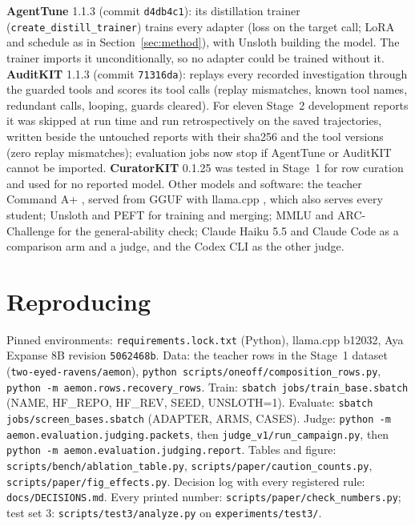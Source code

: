 \documentclass[11pt]{article}
\begin{document}
\textbf{AgentTune} 1.1.3 (commit \texttt{d4db4c1}): its distillation trainer (\texttt{create\_distill\_trainer})
trains every adapter (loss on the target call; LoRA and schedule as in Section~\ref{sec:method}), with Unsloth
building the model. The trainer imports it unconditionally, so no adapter could be trained without it.
\textbf{AuditKIT} 1.1.3 (commit \texttt{71316da}): replays every recorded investigation through the guarded tools and
scores its tool calls (replay mismatches, known tool names, redundant calls, looping, guards cleared). For eleven
Stage~2 development reports it was skipped at run time and run retrospectively on the saved trajectories, written
beside the untouched reports with their sha256 and the tool versions (zero replay mismatches); evaluation jobs now stop
if AgentTune or AuditKIT cannot be imported. \textbf{CuratorKIT} 0.1.25 \citep{lexsi_curatorkit} was tested in Stage~1 for row curation and
used for no reported model. Other models and software: the teacher Command A+ \citep{cohere2025commanda}, served
from GGUF with llama.cpp \citep{llamacpp}, which also serves every student; Unsloth \citep{unsloth} and PEFT
\citep{peft} for training and merging; MMLU \citep{hendrycks2021mmlu} and ARC-Challenge \citep{clark2018arc} for the
general-ability check; Claude Haiku 5.5 and Claude Code \citep{anthropic2026claude} as a comparison arm and a judge,
and the Codex CLI \citep{openai2026codex} as the other judge.

\section{Reproducing}

Pinned environments: \texttt{requirements.lock.txt} (Python), llama.cpp b12032, Aya Expanse 8B revision
\texttt{5062468b}. Data: the teacher rows in the Stage~1 dataset (\texttt{two-eyed-ravens/aemon}), \texttt{python scripts/oneoff/composition\_rows.py},
\texttt{python -m aemon.rows.recovery\_rows}. Train: \texttt{sbatch jobs/train\_base.sbatch} (NAME, HF\_REPO, HF\_REV,
SEED, UNSLOTH=1). Evaluate: \texttt{sbatch jobs/screen\_bases.sbatch} (ADAPTER, ARMS, CASES). Judge:
\texttt{python -m aemon.evaluation.judging.packets}, then \texttt{judge\_v1/run\_campaign.py}, then
\texttt{python -m aemon.evaluation.judging.report}. Tables and figure: \texttt{scripts/bench/ablation\_table.py},
\texttt{scripts/paper/caution\_counts.py}, \texttt{scripts/paper/fig\_effects.py}. Decision log with every
registered rule: \texttt{docs/DECISIONS.md}. Every printed number: \texttt{scripts/paper/check\_numbers.py};
test set 3: \texttt{scripts/test3/analyze.py} on \texttt{experiments/test3/}.
\end{document}
